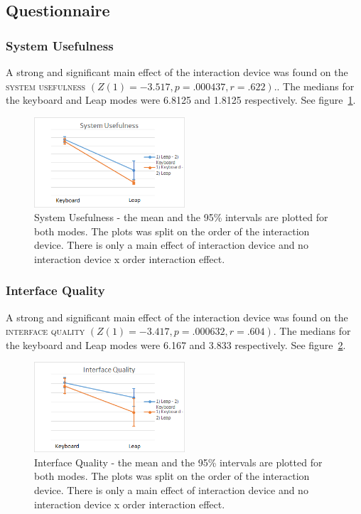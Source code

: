 \subsection{Questionnaire}
\subsubsection{System Usefulness}

A strong and significant main effect of the interaction device was found on the \textsc{system usefulness} $(Z(1) = -3.517, p = .000437, r = .622)$.. The medians for the 
keyboard and Leap modes were 6.8125 and 1.8125 respectively. See figure~\ref{fig:system_usefulness}.

\begin{figure}[H]
\centering
\includegraphics[width=0.5\textwidth]{imgs/results/system_usefulness}
\caption{System Usefulness - the mean and the 95\% intervals are plotted for both modes. The plots was split on the order of the interaction device. There is only a main 
effect of interaction device and no interaction device x order interaction effect.}
\label{fig:system_usefulness}
\end{figure}

\subsubsection{Interface Quality}

A strong and significant main effect of the interaction device was found on the \textsc{interface quality} $(Z(1) = -3.417, p = .000632, r = .604)$. The medians for the 
keyboard and Leap modes were 6.167 and 3.833 respectively. See figure~\ref{fig:interface_quality}.

\begin{figure}[H]
\centering
\includegraphics[width=0.5\textwidth]{imgs/results/interface_quality}
\caption{Interface Quality - the mean and the 95\% intervals are plotted for both modes. The plots was split on the order of the interaction device. There is only a main 
effect of interaction device and no interaction device x order interaction effect.}
\label{fig:interface_quality}
\end{figure}

